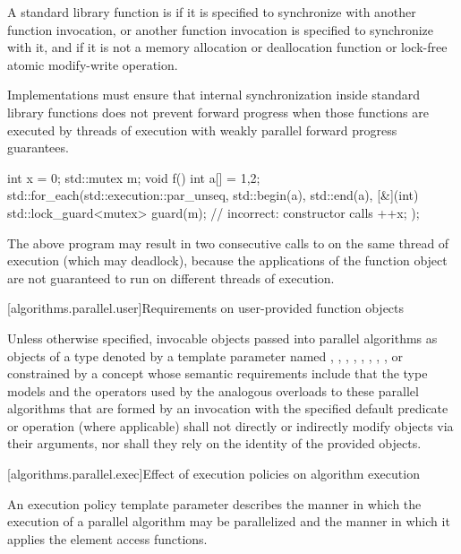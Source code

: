 \pnum
A standard library function is 
if it is specified to synchronize with another function invocation, or
another function invocation is specified to synchronize with it,
and if it is not a memory allocation or deallocation function
or lock-free atomic modify-write operation.
\begin{note}
Implementations must ensure that internal synchronization
inside standard library functions does not prevent forward progress
when those functions are executed by threads of execution
with weakly parallel forward progress guarantees.
\end{note}
\begin{example}
\begin{codeblock}
int x = 0;
std::mutex m;
void f() {
  int a[] = {1,2};
  std::for_each(std::execution::par_unseq, std::begin(a), std::end(a), [&](int) {
    std::lock_guard<mutex> guard(m);            // incorrect:  constructor calls 
    ++x;
  });
}
\end{codeblock}
The above program may result in two consecutive calls to 
on the same thread of execution (which may deadlock),
because the applications of the function object are not guaranteed
to run on different threads of execution.
\end{example}

[algorithms.parallel.user]{Requirements on user-provided function objects}

\pnum
Unless otherwise specified,
invocable objects passed into parallel algorithms as objects of a type
denoted by a template parameter named
,
,
,
,
,
,
,
, or
constrained by a concept
whose semantic requirements include
that the type models 
and the operators used by the analogous overloads to these parallel algorithms
that are formed by an invocation
with the specified default predicate or operation (where applicable)
shall not directly or indirectly modify objects via their arguments,
nor shall they rely on the identity of the provided objects.

[algorithms.parallel.exec]{Effect of execution policies on algorithm execution}

\pnum
An execution policy template parameter describes
the manner in which the execution of a parallel algorithm may be
parallelized and the manner in which it applies the element access functions.

